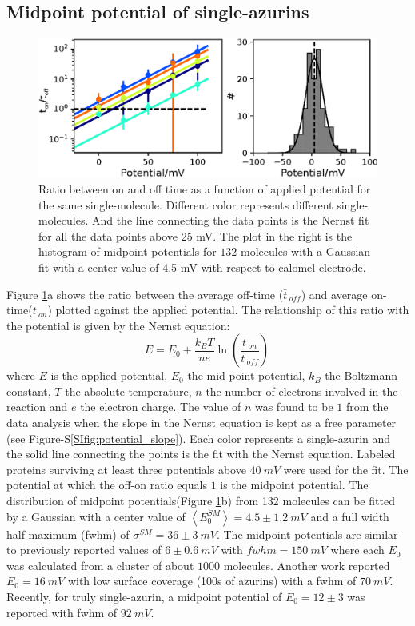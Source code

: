 \documentclass[journal=jacsat,manuscript=article]{achemso}
\newcommand*\me[1]{\ensuremath{\bar{#1}\,}}
\begin{document}
\subsection{Midpoint potential of single-azurins}
\begin{figure}
	\centering
	\includegraphics[]{Figure_2_midpoint.eps}
	\caption{Ratio between on and off time as a function of applied potential for the same single-molecule. Different color represents different single-molecules. And the line connecting the data points is the Nernst fit for all the data points above 25 mV. The plot in the right is the histogram of midpoint potentials for $132$ molecules with a Gaussian fit with a center value of 4.5 mV with respect to calomel electrode.}
	\label{fig:midpoint}
\end{figure}
Figure \ref{fig:midpoint}a shows the ratio between the average off-time ($\me{t}_{off}$) and average on-time($\me{t}_{on}$) plotted against the applied potential. The relationship of this ratio with the potential is given by the Nernst equation: 
\begin{equation}
	E = E_0 + \frac{k_BT}{n e}\ln\left(\frac{\me{t}_{on}}{\me{t}_{off}}\right)\,
	\label{eq:nernst}
\end{equation}
where $E$ is the applied potential, $E_0$ the mid-point potential, $k_B$ the Boltzmann constant, $T$ the absolute temperature, $n$ the number of electrons involved in the reaction and $e$ the electron charge. The value of $n$ was found to be $1$ from the data analysis when the slope in the Nernst equation is kept as a free parameter (see Figure-S\ref{SIfig:potential_slope}). Each color represents a single-azurin and the solid line connecting the points is the fit with the Nernst equation. Labeled proteins surviving at least three potentials above $40~mV$ were used for the fit. The potential at which the off-on ratio equals $1$ is the midpoint potential. The distribution of midpoint potentials(Figure \ref{fig:midpoint}b) from 132 molecules can be fitted by a Gaussian with a center value of $\left<E_0^{SM}\right>=4.5 \pm 1.2~mV$ and a full width half maximum (fwhm) of $\sigma^{SM}=36 \pm 3~mV$. The midpoint potentials are similar to previously reported values of $6\pm0.6~mV$ with $fwhm=150~mV$ where each $E_0$ was calculated from a cluster of about $1000$ molecules.\cite{davis2006monitoring} Another work reported $E_0 = 16~mV$ with low surface coverage (100s of azurins) with a fwhm of $70~mV$.\cite{salverda2010fluorescent} Recently, for truly single-azurin, a midpoint potential of $E_0=12\pm3$ was reported with fwhm of $92~mV$.\cite{akkilic2014chemically-induced}\\
\end{document}
